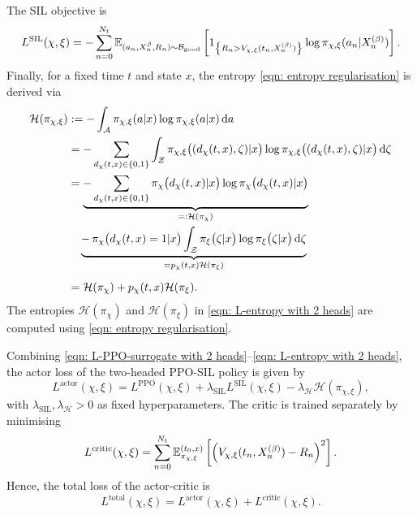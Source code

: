 The SIL objective is 
\begin{equation}
    L^{\text{SIL}}(\chi, \xi) = -\sum_{n=0}^{N_t}\mathbb{E}_{(a_n, X^{\beta}_n, R_n) \sim \mathcal{B}_{\text{good}}} \left[ 1_{\left\{R_n > V_{\chi, \xi}(t_n,X^{(\beta)}_n)\right\}} \log \pi_{\chi, \xi}(a_n | X^{(\beta)}_n) \right].
    \label{eqn: L-SIL with 2 heads}
\end{equation}
Finally, for a fixed time $t$ and state $x$, the entropy \eqref{eqn: entropy regularisation} is derived via
\begin{align}
    \mathcal{H}(\pi_{\chi, \xi}) &:= - \int_\mathcal{A} \pi_{\chi, \xi}(a|x) \log \pi_{\chi, \xi}(a|x) \,\mathrm{d} a \nonumber \\
    &= - \sum_{d_\chi(t,x)\in \{0,1\}} \int_\mathcal{Z} \pi_{\chi, \xi}\big((d_\chi(t,x), \zeta) | x\big) \log \pi_{\chi, \xi}\big((d_\chi(t,x), \zeta) | x\big) \,\mathrm{d} \zeta \nonumber \\
    &= \underbrace{- \sum_{d_\chi(t,x) \in \{0,1\}} \pi_\chi\big(d_\chi(t,x) | x\big) \log\pi_\chi\big(d_\chi(t,x) | x\big) }_{=: \mathcal{H}(\pi_\chi)} \nonumber \\ 
    & \quad \underbrace{ - \,\pi_\chi \big(d_\chi(t,x) = 1 | x\big) \int_\mathcal{Z} \pi_\xi\big( \zeta| x\big) \log \pi_\xi\big( \zeta| x\big) \,\mathrm{d} \zeta}_{= p_\chi(t,x) \mathcal{H}(\pi_\xi)} \nonumber \\[0.5em]
    &= \mathcal{H}(\pi_\chi) + p_\chi(t,x) \mathcal{H}(\pi_\xi).
    \label{eqn: L-entropy with 2 heads} 
\end{align}
The entropies $\mathcal{H}(\pi_\chi)$ and $\mathcal{H}(\pi_\xi)$ in \eqref{eqn: L-entropy with 2 heads} are computed using \eqref{eqn: entropy regularisation}.

Combining \eqref{eqn: L-PPO-surrogate with 2 heads}--\eqref{eqn: L-entropy with 2 heads}, the actor loss of the two-headed PPO-SIL policy is given by
\begin{equation*}
    L^{\text{actor}}(\chi, \xi) = L^{\text{PPO}}(\chi, \xi) + \lambda_{\text{SIL}}L^{\text{SIL}}(\chi, \xi) - \lambda_\mathcal{H}\mathcal{H}(\pi_{\chi, \xi}),
\end{equation*}
with $\lambda_{\text{SIL}}, \lambda_\mathcal{H}>0$ as fixed hyperparameters. The critic is trained separately by minimising 
\begin{equation*}
    L^{\text{critic}}(\chi, \xi) = \sum_{n=0}^{N_t} \mathbb{E}^{(t_0,x)}_{\pi_{\chi, \xi}}\left[ \left(V_{\chi, \xi}(t_n,X^{(\beta)}_n) - R_n\right)^2 \right].
\end{equation*}
Hence, the total loss of the actor-critic is 
\begin{equation}
    L^{\text{total}}(\chi, \xi) = L^{\text{actor}}(\chi, \xi) + L^{\text{critic}}(\chi, \xi).
    \label{eqn: L-total with 2 heads}
\end{equation}


